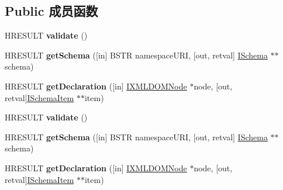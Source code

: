 \subsection*{Public 成员函数}
\begin{DoxyCompactItemize}
\item 
\mbox{\label{interface_m_s_x_m_l2_1_1_i_x_m_l_d_o_m_schema_collection2_a935fdc096a37a40d4199416afb5ac926}} 
H\+R\+E\+S\+U\+LT {\bfseries validate} ()
\item 
\mbox{\label{interface_m_s_x_m_l2_1_1_i_x_m_l_d_o_m_schema_collection2_a3a6f724b1e8e4847ae3b6cf813c636ef}} 
H\+R\+E\+S\+U\+LT {\bfseries get\+Schema} (\mbox{[}in\mbox{]} B\+S\+TR namespace\+U\+RI, \mbox{[}out, retval\mbox{]} \hyperlink{interface_m_s_x_m_l2_1_1_i_schema}{I\+Schema} $\ast$$\ast$schema)
\item 
\mbox{\label{interface_m_s_x_m_l2_1_1_i_x_m_l_d_o_m_schema_collection2_ad472a4b73aac211c36226e8e6d31a694}} 
H\+R\+E\+S\+U\+LT {\bfseries get\+Declaration} (\mbox{[}in\mbox{]} \hyperlink{interface_m_s_x_m_l2_1_1_i_x_m_l_d_o_m_node}{I\+X\+M\+L\+D\+O\+M\+Node} $\ast$node, \mbox{[}out, retval\mbox{]}\hyperlink{interface_m_s_x_m_l2_1_1_i_schema_item}{I\+Schema\+Item} $\ast$$\ast$item)
\item 
\mbox{\label{interface_m_s_x_m_l2_1_1_i_x_m_l_d_o_m_schema_collection2_a935fdc096a37a40d4199416afb5ac926}} 
H\+R\+E\+S\+U\+LT {\bfseries validate} ()
\item 
\mbox{\label{interface_m_s_x_m_l2_1_1_i_x_m_l_d_o_m_schema_collection2_a3a6f724b1e8e4847ae3b6cf813c636ef}} 
H\+R\+E\+S\+U\+LT {\bfseries get\+Schema} (\mbox{[}in\mbox{]} B\+S\+TR namespace\+U\+RI, \mbox{[}out, retval\mbox{]} \hyperlink{interface_m_s_x_m_l2_1_1_i_schema}{I\+Schema} $\ast$$\ast$schema)
\item 
\mbox{\label{interface_m_s_x_m_l2_1_1_i_x_m_l_d_o_m_schema_collection2_ad472a4b73aac211c36226e8e6d31a694}} 
H\+R\+E\+S\+U\+LT {\bfseries get\+Declaration} (\mbox{[}in\mbox{]} \hyperlink{interface_m_s_x_m_l2_1_1_i_x_m_l_d_o_m_node}{I\+X\+M\+L\+D\+O\+M\+Node} $\ast$node, \mbox{[}out, retval\mbox{]}\hyperlink{interface_m_s_x_m_l2_1_1_i_schema_item}{I\+Schema\+Item} $\ast$$\ast$item)

\end{DoxyCompactItemize}
